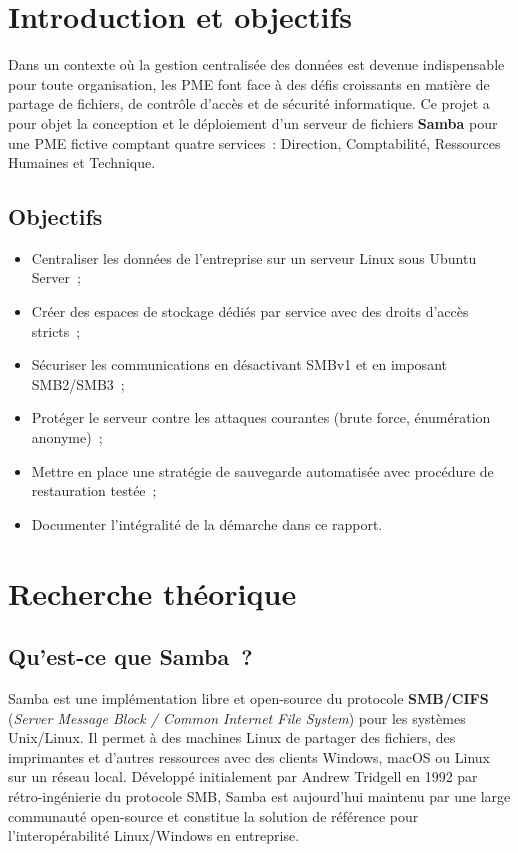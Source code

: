 \documentclass[12pt,a4paper]{article}
\begin{document}
\section{Introduction et objectifs}

Dans un contexte où la gestion centralisée des données est devenue indispensable pour toute
organisation, les PME font face à des défis croissants en matière de partage de fichiers, de
contrôle d'accès et de sécurité informatique. Ce projet a pour objet la conception et le
déploiement d'un serveur de fichiers \textbf{Samba} pour une PME fictive comptant quatre
services~: Direction, Comptabilité, Ressources Humaines et Technique.

\subsection*{Objectifs}

\begin{itemize}[leftmargin=2em]
  \item Centraliser les données de l'entreprise sur un serveur Linux sous Ubuntu Server~;
  \item Créer des espaces de stockage dédiés par service avec des droits d'accès stricts~;
  \item Sécuriser les communications en désactivant SMBv1 et en imposant SMB2/SMB3~;
  \item Protéger le serveur contre les attaques courantes (brute force, énumération anonyme)~;
  \item Mettre en place une stratégie de sauvegarde automatisée avec procédure de restauration testée~;
  \item Documenter l'intégralité de la démarche dans ce rapport.
\end{itemize}

\section{Recherche théorique}

\subsection{Qu'est-ce que Samba~?}

Samba est une implémentation libre et open-source du protocole \textbf{SMB/CIFS}
(\textit{Server Message Block / Common Internet File System}) pour les systèmes Unix/Linux.
Il permet à des machines Linux de partager des fichiers, des imprimantes et d'autres ressources
avec des clients Windows, macOS ou Linux sur un réseau local. Développé initialement par
Andrew Tridgell en 1992 par rétro-ingénierie du protocole SMB, Samba est aujourd'hui
maintenu par une large communauté open-source et constitue la solution de référence pour
l'interopérabilité Linux/Windows en entreprise.
\end{document}
